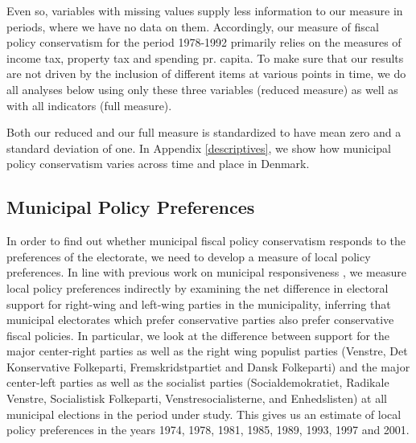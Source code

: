 \documentclass[a4paper,12pt]{article}
\begin{document}
Even so, variables with missing values supply less information to our measure in periods, where we have no data on them. Accordingly, our measure of fiscal policy conservatism for the period 1978-1992 primarily relies on the measures of income tax, property tax and spending pr. capita. To make sure that our results are not driven by the inclusion of different items at various points in time, we do all analyses below using only these three variables (reduced measure) as well as with all indicators (full measure).

Both our reduced and our full measure is standardized to have mean zero and a standard deviation of one. In Appendix \ref{descriptives}, we show how municipal policy conservatism varies across time and place in Denmark.



\subsection*{Municipal Policy Preferences}

In order to find out whether municipal fiscal policy conservatism responds to the preferences of the electorate, we need to develop a measure of local policy preferences. In line with previous work on municipal responsiveness \cite[e.g.,][]{sances2017ideology,einstein2016pushing}, we measure local policy preferences indirectly by examining the net difference in electoral support for right-wing and left-wing parties in the municipality, inferring that municipal electorates which prefer conservative parties also prefer conservative fiscal policies. In particular, we look at the difference between support for the major center-right parties as well as the right wing populist parties (Venstre, Det Konservative Folkeparti, Fremskridstpartiet and Dansk Folkeparti) and the major center-left parties as well as the socialist parties (Socialdemokratiet, Radikale Venstre, Socialistisk Folkeparti, Venstresocialisterne, and Enhedslisten) at all municipal elections in the period under study. This gives us an estimate of local policy preferences in the years 1974, 1978, 1981, 1985, 1989, 1993, 1997 and 2001.
\end{document}
